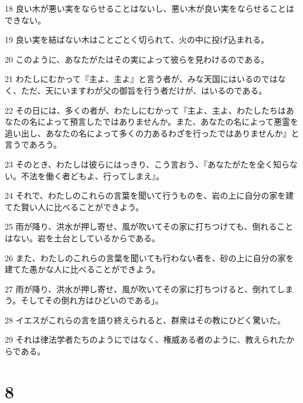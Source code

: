 \par 18 良い木が悪い実をならせることはないし、悪い木が良い実をならせることはできない。
\par 19 良い実を結ばない木はことごとく切られて、火の中に投げ込まれる。
\par 20 このように、あなたがたはその実によって彼らを見わけるのである。
\par 21 わたしにむかって『主よ、主よ』と言う者が、みな天国にはいるのではなく、ただ、天にいますわが父の御旨を行う者だけが、はいるのである。
\par 22 その日には、多くの者が、わたしにむかって『主よ、主よ、わたしたちはあなたの名によって預言したではありませんか。また、あなたの名によって悪霊を追い出し、あなたの名によって多くの力あるわざを行ったではありませんか』と言うであろう。
\par 23 そのとき、わたしは彼らにはっきり、こう言おう、『あなたがたを全く知らない。不法を働く者どもよ、行ってしまえ』。
\par 24 それで、わたしのこれらの言葉を聞いて行うものを、岩の上に自分の家を建てた賢い人に比べることができよう。
\par 25 雨が降り、洪水が押し寄せ、風が吹いてその家に打ちつけても、倒れることはない。岩を土台としているからである。
\par 26 また、わたしのこれらの言葉を聞いても行わない者を、砂の上に自分の家を建てた愚かな人に比べることができよう。
\par 27 雨が降り、洪水が押し寄せ、風が吹いてその家に打ちつけると、倒れてしまう。そしてその倒れ方はひどいのである」。
\par 28 イエスがこれらの言を語り終えられると、群衆はその教にひどく驚いた。
\par 29 それは律法学者たちのようにではなく、権威ある者のように、教えられたからである。

\chapter{8}


